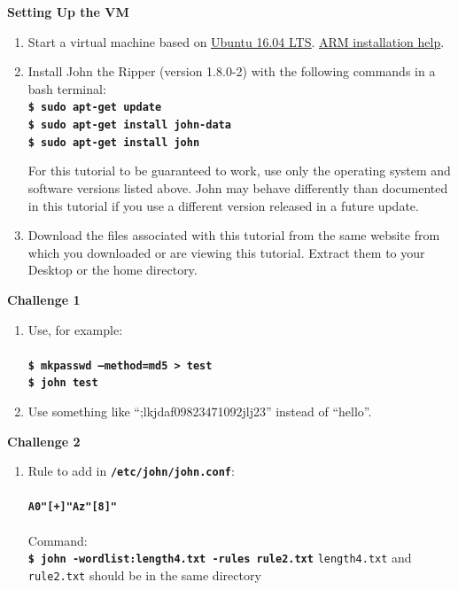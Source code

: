 \documentclass[12pt]{extarticle}
\newcommand{\code}[1]{\texttt{\bfseries#1}}
\newcommand{\ben}{\begin{enumerate}}
\newcommand{\een}{\end{enumerate}}
\begin{document}
\textbf{Setting Up the VM}
	
\begin{enumerate}
	\item Start a virtual machine based on \hyperref{https://releases.ubuntu.com/16.04/}{}{}{\underline{Ubuntu 16.04 LTS}}. \hyperref{https://wiki.ubuntu.com/ARM/Server/Install}{}{}{\underline{ARM installation help}}.
	\item Install John the Ripper (version 1.8.0-2) with the following commands in a bash terminal:\\
			\code{\$ sudo apt-get update \\
			\$ sudo apt-get install john-data \\
			\$ sudo apt-get install john}

For this tutorial to be guaranteed to work, use only the operating system and software versions listed above. John may behave differently than documented in this tutorial if you use a different version released in a future update.
	\item{Download the files associated with this tutorial from the same website from which you downloaded or are viewing this tutorial. Extract them to your Desktop or the home directory.}
\end{enumerate}

\textbf{Challenge 1}

\ben

\item Use, for example: \\\\
\code{\$ mkpasswd --method=md5 > test\\
	  \$ john test} \\
	
\item Use something like ``;lkjdaf09823471092jlj23'' instead of ``hello''.

\een

\textbf{Challenge 2}
\ben

\item Rule to add in \code{/etc/john/john.conf}: \\\\
\code{A0"[+]"Az"[8]"}\\\\
Command:\\ \code{\$ john -wordlist:length4.txt -rules rule2.txt}
\texttt{length4.txt} and \texttt{rule2.txt} should be in the same directory

\een
\end{document}
